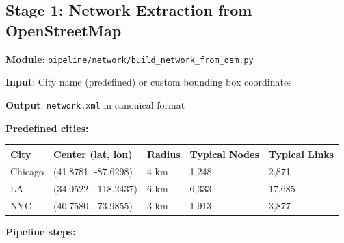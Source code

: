 \subsection{Stage 1: Network Extraction from
OpenStreetMap}\label{332-stage-1-network-extraction-from-openstreetmap}

\textbf{Module}: \texttt{pipeline/network/build\_network\_from\_osm.py}

\textbf{Input}: City name (predefined) or custom bounding box
coordinates

\textbf{Output}: \texttt{network.xml} in canonical format

\textbf{Predefined cities:}

\begin{longtable}[]{@{}lllll@{}}
\toprule\noalign{}
City & Center (lat, lon) & Radius & Typical Nodes & Typical Links \\
\midrule\noalign{}
\endhead
\bottomrule\noalign{}
\endlastfoot
Chicago & (41.8781, -87.6298) & 4 km & 1,248 & 2,871 \\
LA & (34.0522, -118.2437) & 6 km & 6,333 & 17,685 \\
NYC & (40.7580, -73.9855) & 3 km & 1,913 & 3,877 \\
\end{longtable}

\textbf{Pipeline steps:}

